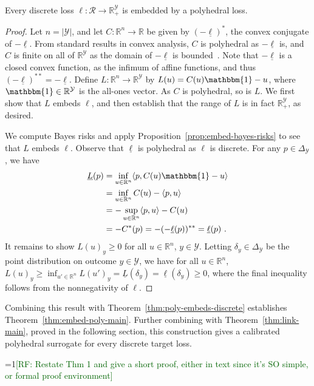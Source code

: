 \documentclass[twoside,11pt]{article}
\newcommand{\Comments}{1}
\newcommand{\mynote}[2]{\ifnum\Comments=1\textcolor{#1}{#2}\fi}
\newcommand{\raf}[1]{\mynote{darkgreen}{[RF: #1]}}
\newcommand{\reals}{\mathbb{R}}
\newcommand{\simplex}{\Delta_\Y}
\newcommand{\R}{\mathcal{R}}
\newcommand{\Y}{\mathcal{Y}}
\newcommand{\risk}[1]{\underline{#1}}
\newcommand{\inprod}[2]{\langle #1, #2 \rangle}%
\newcommand{\ones}{\mathbbm{1}}
\begin{document}
\begin{theorem}\label{thm:discrete-loss-poly-embeddable}
  Every discrete loss $\ell:\R \to \reals^\Y_+$ is embedded by a polyhedral loss.
\end{theorem}
\begin{proof}
  Let $n = |\Y|$, and let $C:\reals^n \to \reals$ be given by $(-\risk{\ell})^*$, the convex conjugate of $-\risk{\ell}$.
  From standard results in convex analysis, $C$ is polyhedral as $-\risk{\ell}$ is, and $C$ is finite on all of $\reals^\Y$ as the domain of $-\risk{\ell}$ is bounded~\cite[Corollary 13.3.1]{rockafellar1997convex}.
  Note that $-\risk{\ell}$ is a closed convex function, as the infimum of affine functions, and thus $(-\risk{\ell})^{**} = -\risk{\ell}$.
  Define $L:\reals^n\to\reals^\Y$ by $L(u) = C(u)\ones - u$, where $\ones\in\reals^\Y$ is the all-ones vector.
  As $C$ is polyhedral, so is $L$.
  We first show that $L$ embeds $\ell$, and then establish that the range of $L$ is in fact $\reals^\Y_+$, as desired.

  We compute Bayes risks and apply Proposition~\ref{prop:embed-bayes-risks} to see that $L$ embeds $\ell$.
  Observe that $\risk{\ell}$ is polyhedral as $\ell$ is discrete.
  For any $p\in\simplex$, we have
  \begin{align*}
    \risk{L}(p)
    &= \inf_{u\in\reals^n} \inprod{p}{C(u)\ones - u}\\
    &= \inf_{u\in\reals^n} C(u) - \inprod{p}{u}\\
    &= -\sup_{u\in\reals^n} \inprod{p}{u} - C(u)\\
    &= -C^*(p) = - (-\risk{\ell}(p))^{**} = \risk{\ell}(p)~.
  \end{align*}
  It remains to show $L(u)_y \geq 0$ for all $u\in\reals^n$, $y\in\Y$.
  Letting $\delta_y\in\simplex$ be the point distribution on outcome $y\in\Y$, we have for all $u\in\reals^n$, $L(u)_y \geq \inf_{u'\in\reals^n} L(u')_y = \risk{L}(\delta_y) = \risk{\ell}(\delta_y) \geq 0$, where the final inequality follows from the nonnegativity of $\ell$.
\end{proof}

Combining this result with Theorem~\ref{thm:poly-embeds-discrete} establishes Theorem~\ref{thm:embed-poly-main}.
Further combining with Theorem~\ref{thm:link-main}, proved in the following section, this construction gives a calibrated polyhedral surrogate for every discrete target loss.

\raf{Restate Thm 1 and give a short proof, either in text since it's SO simple, or formal proof environment}
\end{document}
